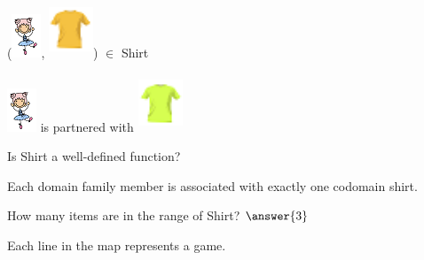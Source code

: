 \documentclass{ximera}
\begin{document}
\begin{exercise}

 ({\includegraphics[width=33px,height=49px]{pics/elements/family/family2.png}}, {\includegraphics[width=50px,height=65px]{pics/elements/shirts/shirts2.png}}) $\in$ Shirt 

  \begin{multipleChoice}
  \end{multipleChoice}
  \begin{feedback}
{\includegraphics[width=33px,height=49px]{pics/elements/family/family2.png}} is partnered with {\includegraphics[width=50px,height=65px]{pics/elements/shirts/shirts4.png}}
  \end{feedback}
\end{exercise}






\begin{exercise}
Is Shirt a well-defined function?
  \begin{multipleChoice}
  \end{multipleChoice}
  \begin{feedback}
Each domain family member is associated with exactly one codomain shirt.
  \end{feedback}
\end{exercise}





\begin{exercise}
How many items are in the range of Shirt? $\answer{3}$
  \begin{feedback}
Each line in the map represents a game.
  \end{feedback}
\end{exercise}
\end{document}
